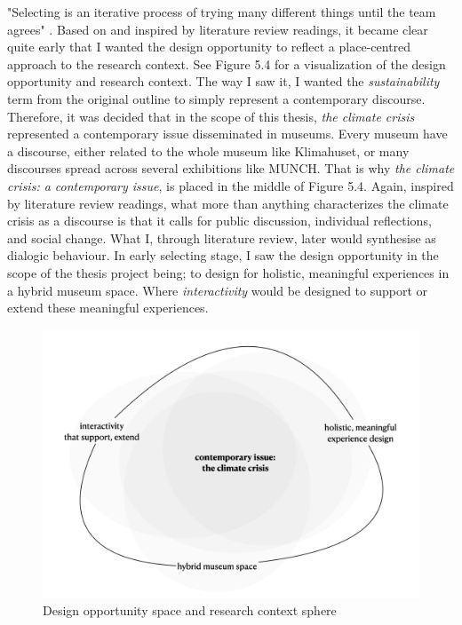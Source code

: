 \break
"Selecting is an iterative process of trying many different things until the team agrees" \autocite[p. 185]{zimmerman_research_2014}. Based on and inspired by literature review readings, it became clear quite early that I wanted the design opportunity to reflect a place-centred approach to the research context. See Figure 5.4 for a visualization of the design opportunity and research context. The way I saw it, I wanted the \textit{sustainability} term from the original outline to simply represent a contemporary discourse. Therefore, it was decided that in the scope of this thesis, \emph{the climate crisis} represented a contemporary issue disseminated in museums. Every museum have a discourse, either related to the whole museum like Klimahuset, or many discourses spread across several exhibitions like MUNCH. That is why \emph{the climate crisis: a contemporary issue}, is placed in the middle of Figure 5.4. Again, inspired by literature review readings, what more than anything characterizes the climate crisis as a discourse is that it calls for public discussion, individual reflections, and social change. What I, through literature review, later would synthesise as dialogic behaviour. In early selecting stage, I saw the design opportunity in the scope of the thesis project being; to design for holistic, meaningful experiences in a hybrid museum space. Where \emph{interactivity} would be designed to support or extend these meaningful experiences.

\begin{figure}[H]
\centering
\includegraphics[width=12.5cm]{pictures/methodology/problem_sphere.png}
\caption{Design opportunity space and research context sphere}
\end{figure}

